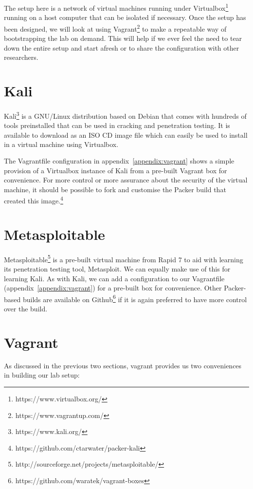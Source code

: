 \documentclass{report}
\begin{document}
The setup here is a network of virtual machines running under Virtualbox\footnote{https://www.virtualbox.org/}
running on a host computer that can be isolated if necessary. Once the
setup has been designed, we will look at using Vagrant\footnote{https://www.vagrantup.com/}
to make a repeatable
way of bootstrapping the lab on demand. This will help if we ever feel the
need to tear down the entire setup and start afresh or to share the
configuration with other researchers.

\section{Kali}

Kali\footnote{https://www.kali.org/}
is a GNU/Linux distribution based on Debian that comes with hundreds
of tools preinstalled that can be used in cracking and penetration testing. It
is available to download as an ISO CD image file which can easily be used
to install in a virtual machine using Virtualbox.

The Vagrantfile configuration in appendix~\ref{appendix:vagrant} shows a
simple provision of a Virtualbox instance of Kali from a pre-built
Vagrant box for convenience. For more control or more assurance about the
security of the virtual machine, it should be possible to fork and customise
the Packer build that created this image.\footnote{https://github.com/ctarwater/packer-kali}

\section{Metasploitable}

Metasploitable\footnote{http://sourceforge.net/projects/metasploitable/}
is a pre-built virtual machine from Rapid 7 to aid with learning
its penetration testing tool, Metasploit. We can equally make use of this
for learning Kali. As with Kali, we can add a configuration to our Vagrantfile
(appendix~\ref{appendix:vagrant}) for a pre-built box for convenience. Other
Packer-based builds are available on Github\footnote{https://github.com/waratek/vagrant-boxes}
if it is again preferred to have more control over the build.

\section{Vagrant}

As discussed in the previous two sections, vagrant provides us two conveniences
in building our lab setup:
\end{document}
